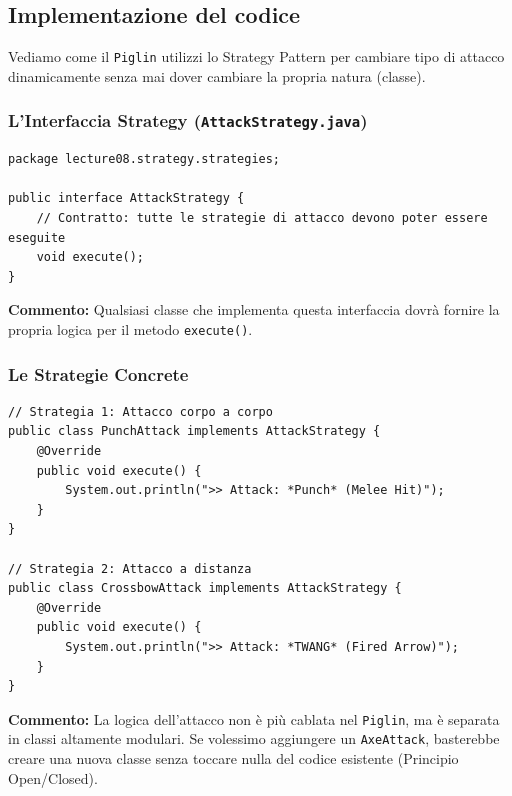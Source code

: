 \documentclass[12pt, a4paper]{article}
\begin{document}
\newpage

\subsection{Implementazione del codice}
Vediamo come il \texttt{Piglin} utilizzi lo Strategy Pattern per cambiare tipo di attacco dinamicamente senza mai dover cambiare la propria natura (classe).

\subsubsection{L'Interfaccia Strategy (\texttt{AttackStrategy.java})}
\begin{verbatim}
package lecture08.strategy.strategies;

public interface AttackStrategy {
    // Contratto: tutte le strategie di attacco devono poter essere eseguite
    void execute();
}
\end{verbatim}
\textbf{Commento:} Qualsiasi classe che implementa questa interfaccia dovrà fornire la propria logica per il metodo \texttt{execute()}. 

\subsubsection{Le Strategie Concrete}
\begin{verbatim}
// Strategia 1: Attacco corpo a corpo
public class PunchAttack implements AttackStrategy {
    @Override
    public void execute() {
        System.out.println(">> Attack: *Punch* (Melee Hit)");
    }
}

// Strategia 2: Attacco a distanza
public class CrossbowAttack implements AttackStrategy {
    @Override
    public void execute() {
        System.out.println(">> Attack: *TWANG* (Fired Arrow)");
    }
}
\end{verbatim}
\textbf{Commento:} La logica dell'attacco non è più cablata nel \texttt{Piglin}, ma è separata in classi altamente modulari. Se volessimo aggiungere un \texttt{AxeAttack}, basterebbe creare una nuova classe senza toccare nulla del codice esistente (Principio Open/Closed).

\newpage
\end{document}
